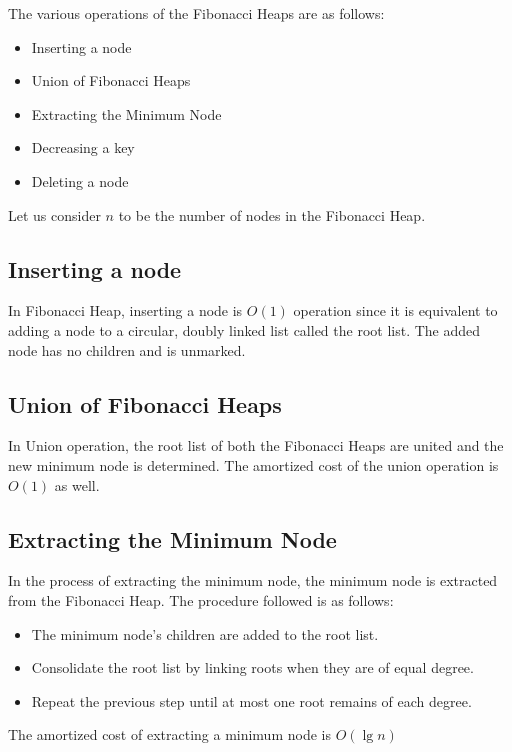 The various operations of the Fibonacci Heaps are as follows:
\begin{itemize}
	\item Inserting a node
	\item Union of Fibonacci Heaps
	\item Extracting the Minimum Node
	\item Decreasing a key
	\item Deleting a node
\end{itemize}

Let us consider $n$ to be the number of nodes in the Fibonacci Heap.

\subsection{Inserting a node}
In Fibonacci Heap, inserting a node is $O(1)$ operation since it is equivalent to adding a node to a circular, doubly linked list called the root list. The added node has no children and is unmarked.

\subsection{Union of Fibonacci Heaps}
In Union operation, the root list of both the Fibonacci Heaps are united  and the new minimum node is determined. The amortized cost of the union operation is $O(1)$ as well.

\subsection{Extracting the Minimum Node}
In the process of extracting the minimum node, the minimum node is extracted from the Fibonacci Heap. The procedure followed is as follows:
\begin{itemize}
	\item The minimum node's children are added to the root list.
	\item Consolidate the root list by linking roots when they are of equal degree.
	\item Repeat the previous step until at most one root remains of each degree.
\end{itemize}
The amortized cost of extracting a minimum node is $O(\lg{n})$

